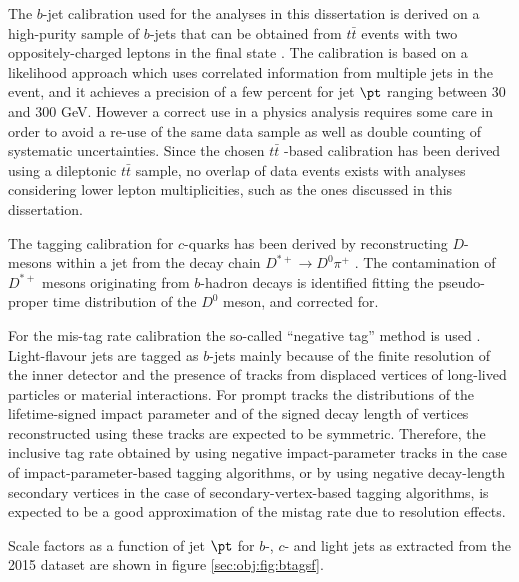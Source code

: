 The $b$-jet calibration used for the analyses in this dissertation is derived on a high-purity sample of $b$-jets that can be obtained from $t\bar{t}$ events with two oppositely-charged leptons in the final state \cite{BTagSF}. The calibration is based on a likelihood approach which uses correlated information from multiple jets in the event, and it achieves a precision of a few percent for jet $\pt$ ranging between 30 and 300 GeV. However a correct use in a physics analysis requires some care in order to avoid a re-use of the same data sample as well as double counting of systematic uncertainties. Since the chosen $t\bar{t}$ -based calibration has been derived using a dileptonic $t\bar{t}$  sample, no overlap of data events exists with analyses considering lower lepton multiplicities, such as the ones discussed in this dissertation.\par
The tagging calibration for $c$-quarks has been derived by reconstructing $D$-mesons within a jet from the decay chain $D^{*+}\to D^{0}\pi^{+}$ \cite{CTagSF}. The contamination of $D^{*+}$ mesons originating from $b$-hadron decays is identified fitting the pseudo-proper time distribution of the $D^{0}$ meson, and corrected for.\par For the mis-tag rate calibration the so-called ``negative tag'' method is used \cite{LTagSF}. 
Light-flavour jets are tagged as $b$-jets mainly because of the finite resolution of the inner detector and the presence of tracks from displaced vertices of long-lived particles or material interactions. For prompt tracks the distributions of the lifetime-signed impact parameter and of the signed decay length of vertices reconstructed using these tracks are expected to be symmetric. Therefore, the inclusive tag rate obtained by using negative impact-parameter tracks in the case of impact-parameter-based tagging algorithms, or by using negative decay-length secondary vertices in the case of secondary-vertex-based tagging algorithms, is expected to be a good approximation of the mistag rate due to resolution effects.\par 
Scale factors as a function of jet $\pt$ for $b$-, $c$- and light jets as extracted from the 2015 dataset are shown in figure \ref{sec:obj:fig:btagsf}.
